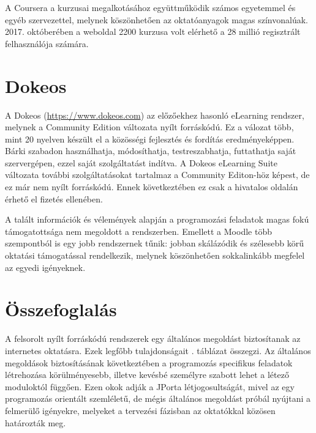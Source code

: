 A Coursera a kurzusai megalkotásához együttműködik számos egyetemmel és egyéb szervezettel, melynek köszönhetően az oktatóanyagok magas színvonalúak. 2017. októberében a weboldal 2200 kurzusa volt elérhető a 28 millió regisztrált felhasználója számára.

\section{Dokeos}

A Dokeos (\url{https://www.dokeos.com}) az előzőekhez hasonló eLearning rendszer, melynek a Community Edition változata nyílt forráskódú. Ez a válozat több, mint 20 nyelven készült el a közösségi fejlesztés és fordítás eredményeképpen. Bárki szabadon használhatja, módosíthatja, testreszabhatja, futtathatja saját szervergépen, ezzel saját szolgáltatást indítva. A Dokeos eLearning Suite változata további szolgáltatásokat tartalmaz a Community Editon-höz képest, de ez már nem nyílt forráskódú. Ennek következtében ez csak a hivatalos oldalán érhető el fizetés ellenében.

A talált információk és vélemények alapján a programozási feladatok magas fokú támogatottsága nem megoldott a rendszerben. Emellett a Moodle több szempontból is egy jobb rendszernek tűnik:  jobban skálázódik és szélesebb körű oktatási támogatással rendelkezik, melynek köszönhetően sokkalinkább megfelel az egyedi igényeknek. \cite{DokeosVsMoodle}

\section{Összefoglalás}

A felsorolt nyílt forráskódú rendszerek egy általános megoldást biztosítanak az internetes oktatásra. Ezek legfőbb tulajdonságait . táblázat összegzi. Az általános megoldások biztosításának következtében a programozás specifikus feladatok létrehozása körülményesebb, illetve kevésbé személyre szabott lehet a létező moduloktól függően. Ezen okok adják a JPorta létjogosultságát, mivel az egy programozás orientált szemléletű, de mégis általános megoldást próbál nyújtani a felmerülő igényekre, melyeket a tervezési fázisban az oktatókkal közösen határozták meg.

